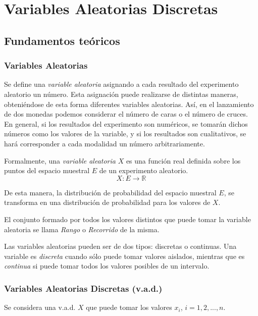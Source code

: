 
\chapter{Variables Aleatorias Discretas}

\section{Fundamentos teóricos}
\subsection{Variables Aleatorias}
Se define una \emph{variable aleatoria} asignando a cada resultado del experimento aleatorio un número. Esta asignación
puede realizarse de distintas maneras, obteniéndose de esta forma diferentes variables aleatorias.
Así, en el lanzamiento de dos monedas podemos considerar el número de caras o el número de cruces.
En general, si los resultados del experimento son numéricos, se tomarán dichos números como los valores de la variable,
y si los resultados son cualitativos, se hará corresponder a cada modalidad un número arbitrariamente.

Formalmente, una \emph{variable aleatoria} $X$ es una función real definida sobre los puntos del espacio muestral $E$ de
un experimento aleatorio. \[ X:E\rightarrow \mathbb{R}\]

De esta manera, la distribución de probabilidad del espacio muestral $E$, se transforma en una distribución de
probabilidad para los valores de $X$.

El conjunto formado por todos los valores distintos que puede tomar la variable aleatoria se llama \emph{Rango} o
\emph{Recorrido} de la misma.

Las variables aleatorias pueden ser de dos tipos: discretas o continuas. Una variable es \emph{discreta} cuando sólo
puede tomar valores aislados, mientras que es \emph{continua} si puede tomar todos los valores posibles de un intervalo.

\subsection{Variables Aleatorias Discretas (v.a.d.)}
Se considera una v.a.d. $X$ que puede tomar los valores $x_i$, $i=1,2,...,n$.

